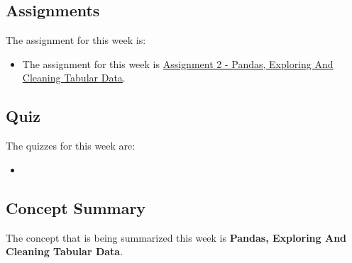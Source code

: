 \subsection{Assignments}

The assignment for this week is:

\begin{itemize}
    \item The assignment for this week is \href{https://github.com/QuantumCompiler/CU/tree/main/CSPB%203022%20-%20Introduction%20To%20Data%20Science%20With%20Probability%20And%20Statistics/CSPB%203022%20-%20Assignments/CSPB%203022%20-%20Assignment%202%20-%20Pandas%2C%20Exploring%20And%20Cleaning%20Tabular%20Data}{Assignment 2 - Pandas, Exploring And Cleaning Tabular Data}. 
\end{itemize}

\subsection{Quiz}

The quizzes for this week are:

\begin{itemize}
    \item {} \textbullet {} 
\end{itemize}

\subsection{Concept Summary}

The concept that is being summarized this week is \textbf{Pandas, Exploring And Cleaning Tabular Data}.

